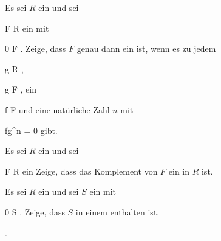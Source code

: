 {}
{





Es sei $R$ ein
und sei

\mavergleichskette
{\vergleichskette
{F
}
{ \subseteq }{ R
}
{  }{
}
{    }{
}
{   }{
}
}
{}{}{}
ein
mit

\mavergleichskette
{\vergleichskette
{ 0
}
{ \notin }{F
}
{  }{
}
{    }{
}
{   }{
}
}
{}{}{.}
Zeige, dass $F$ genau dann ein
ist, wenn es zu jedem

\mavergleichskette
{\vergleichskette
{g
}
{ \in }{ R
}
{  }{
}
{    }{
}
{   }{
}
}
{}{}{,}

\mavergleichskette
{\vergleichskette
{g
}
{ \notin }{F
}
{  }{
}
{    }{
}
{   }{
}
}
{}{}{,}
ein

\mavergleichskette
{\vergleichskette
{f
}
{ \in }{ F
}
{  }{
}
{    }{
}
{   }{
}
}
{}{}{}
und eine natürliche Zahl $n$ mit

\mavergleichskette
{\vergleichskette
{ fg^n
}
{ = }{ 0
}
{  }{
}
{    }{
}
{   }{
}
}
{}{}{}
gibt.





}
{} {}

{}
{





Es sei $R$ ein
und sei

\mavergleichskette
{\vergleichskette
{ F
}
{ \subseteq }{ R
}
{  }{
}
{    }{
}
{   }{
}
}
{}{}{}
ein
Zeige, dass das Komplement von $F$ ein
in $R$ ist.





}
{} {}

{}
{





Es sei $R$ ein
und sei $S$ ein
mit

\mavergleichskette
{\vergleichskette
{ 0
}
{ \notin }{ S
}
{  }{
}
{    }{
}
{   }{
}
}
{}{}{.}
Zeige, dass $S$ in einem
enthalten ist.





}
{ {} {.}} {}

